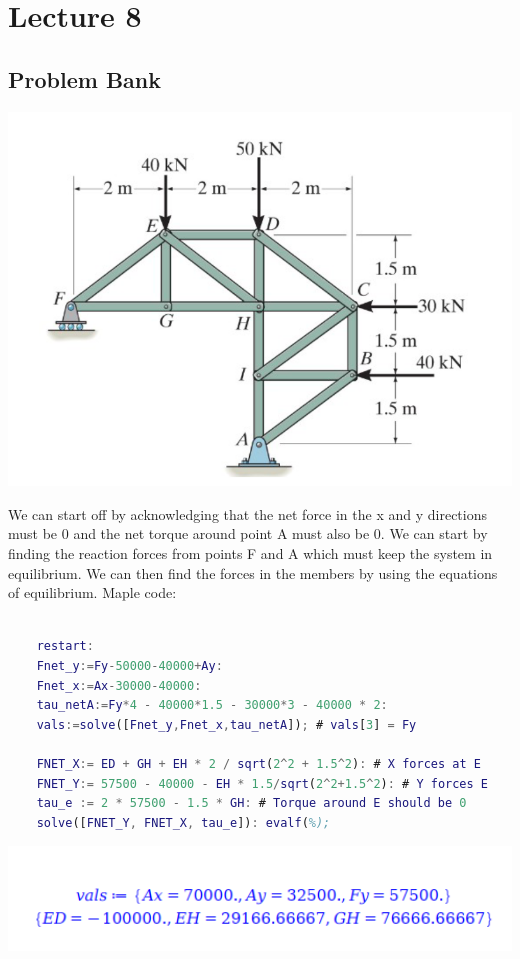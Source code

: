 \documentclass{article}[14pt, letterpaper, Times New Roman]
\begin{document}
\section{Lecture 8}

\subsection{Problem Bank}

\includegraphics[width=15cm]{l8-pbq.png}

We can start off by acknowledging that the net force in the x and y directions must be 0 and the net torque around point A must also be 0.
We can start by finding the reaction forces from points F and A which must keep the system in equilibrium.
We can then find the forces in the members by using the equations of equilibrium.
Maple code:

\begin{lstlisting}[language=matlab]

	restart:
	Fnet_y:=Fy-50000-40000+Ay:
	Fnet_x:=Ax-30000-40000:
	tau_netA:=Fy*4 - 40000*1.5 - 30000*3 - 40000 * 2:
	vals:=solve([Fnet_y,Fnet_x,tau_netA]); # vals[3] = Fy

	FNET_X:= ED + GH + EH * 2 / sqrt(2^2 + 1.5^2): # X forces at E
	FNET_Y:= 57500 - 40000 - EH * 1.5/sqrt(2^2+1.5^2): # Y forces E
	tau_e := 2 * 57500 - 1.5 * GH: # Torque around E should be 0
	solve([FNET_Y, FNET_X, tau_e]): evalf(%);


\end{lstlisting}

\includegraphics[width=15cm]{l8-pbq-o.png}
\end{document}
